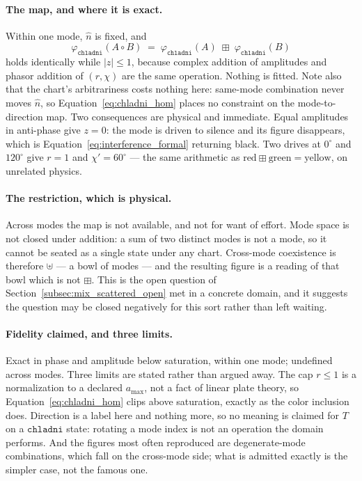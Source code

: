 \documentclass[12pt, a4paper]{article}
\begin{document}
\paragraph{The map, and where it is exact.}
Within one mode, $\hat n$ is fixed, and
\begin{equation}
    \varphi_{\mathtt{chladni}}(A\circ B)
    \;=\;
    \varphi_{\mathtt{chladni}}(A)\;\boxplus\;\varphi_{\mathtt{chladni}}(B)
    \label{eq:chladni_hom}
\end{equation}
holds identically while $|z|\le 1$, because complex addition of
amplitudes and phasor addition of $(r,\chi)$ are the same operation.
Nothing is fitted. Note also that the chart's arbitrariness costs
nothing here: same-mode combination never moves $\hat n$, so
Equation~\eqref{eq:chladni_hom} places no constraint on the
mode-to-direction map. Two consequences are physical and immediate.
Equal amplitudes in anti-phase give $z=0$: the mode is driven to
silence and its figure disappears, which is
Equation~\eqref{eq:interference_formal} returning black. Two drives at
$0^\circ$ and $120^\circ$ give $r=1$ and $\chi'=60^\circ$ --- the same
arithmetic as $\mathrm{red}\boxplus\mathrm{green}=\mathrm{yellow}$,
on unrelated physics.

\paragraph{The restriction, which is physical.}
Across modes the map is not available, and not for want of effort.
Mode space is not closed under addition: a sum of two distinct modes
is not a mode, so it cannot be seated as a single state under any
chart. Cross-mode coexistence is therefore $\uplus$ --- a bowl of
modes --- and the resulting figure is a reading of that bowl which is
not $\boxplus$. This is the open question of
Section~\ref{subsec:mix_scattered_open} met in a concrete domain, and
it suggests the question may be closed negatively for this sort rather
than left waiting.

\paragraph{Fidelity claimed, and three limits.}
Exact in phase and amplitude below saturation, within one mode;
undefined across modes. Three limits are stated rather than argued
away. The cap $r\le 1$ is a normalization to a declared $a_{\max}$,
not a fact of linear plate theory, so
Equation~\eqref{eq:chladni_hom} clips above saturation, exactly as the
color inclusion does. Direction is a label here and nothing more,
so no meaning is claimed for $T$ on a $\mathtt{chladni}$ state:
rotating a mode index is not an operation the domain performs. And the
figures most often reproduced are degenerate-mode combinations, which
fall on the cross-mode side; what is admitted exactly is the simpler
case, not the famous one.
\end{document}
